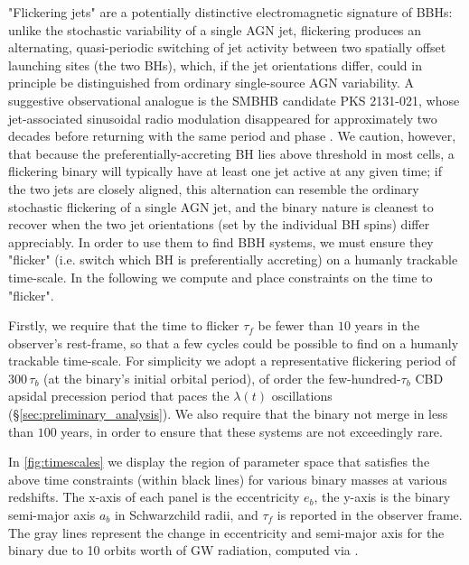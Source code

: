 \documentclass[fleqn,usenatbib]{mnras}
\begin{document}
"Flickering jets" are a potentially distinctive electromagnetic signature of BBHs: unlike the stochastic variability of a single AGN jet, flickering produces an alternating, quasi-periodic switching of jet activity between two spatially offset launching sites (the two BHs), which, if the jet orientations differ, could in principle be distinguished from ordinary single-source AGN variability. A suggestive observational analogue is the SMBHB candidate PKS 2131-021, whose jet-associated sinusoidal radio modulation disappeared for approximately two decades before returning with the same period and phase \citep{O_Neill_2022}. We caution, however, that because the preferentially-accreting BH lies above threshold in most cells, a flickering binary will typically have at least one jet active at any given time; if the two jets are closely aligned, this alternation can resemble the ordinary stochastic flickering of a single AGN jet, and the binary nature is cleanest to recover when the two jet orientations (set by the individual BH spins) differ appreciably. In order to use them to find BBH systems, we must ensure they "flicker" (i.e. switch which BH is preferentially accreting) on a humanly trackable time-scale. In the following we compute  and place constraints on the time to "flicker".

Firstly, we require that the time to flicker $\tau_f$ be fewer than $10$ years in the observer's rest-frame, so that a few cycles could be possible to find on a humanly trackable time-scale. For simplicity we adopt a representative flickering period of $300\,\tau_b$ (at the binary's initial orbital period), of order the few-hundred-$\tau_b$ CBD apsidal precession period that paces the $\lambda(t)$ oscillations (\S\ref{sec:preliminary_analysis}). We also require that the binary not merge in less than $100$ years, in order to ensure that these systems are not exceedingly rare.

In \autoref{fig:timescales} we display the region of parameter space that satisfies the above time constraints (within black lines) for various binary masses at various redshifts. The x-axis of each panel is the eccentricity $e_b$, the y-axis is the binary semi-major axis $a_b$ in Schwarzchild radii, and $\tau_f$ is reported in the observer frame. The gray lines represent the change in eccentricity and semi-major axis for the binary due to 10 orbits worth of GW radiation, computed via \citet{peters_64}.
\end{document}
